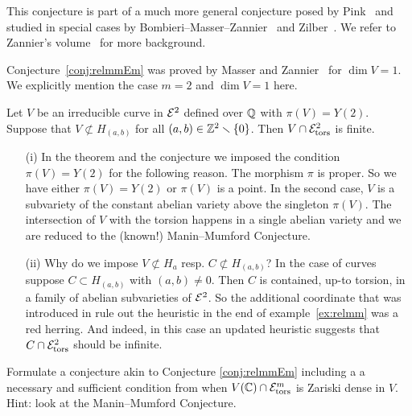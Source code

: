 This conjecture is part of a much more general conjecture posed by
Pink~\cite{Pink} and studied in special cases by
Bombieri--Masser--Zannier~\cite{BMZ,BMZgeometric} and
Zilber~\cite{Zilber}. We refer to Zannier's volume~\cite{ZannierBook}
for more background. 

Conjecture~\ref{conj:relmmEm} was proved by Masser and
Zannier~\cite{MZ:AJM10} for $\dim V = 1$. We explicitly mention the
case $m=2$ and $\dim V=1$ here.

\begin{theorem}
  \label{thm:relmm2}
  Let $V$ be an irreducible curve in ${\mathcal E}^2$ defined over ${\mathbb{Q}}$ with $\pi(V)=Y(2)$. 
  Suppose that $V\not\subset H_{(a,b)}$ for all
  $(a,b)\in{\mathbb{Z}}^2\smallsetminus\{0\}$. Then $V\cap {\mathcal E}^2_{\mathrm{tors}}$ is
  finite. 
\end{theorem}

\begin{remark}
  \begin{enumerate}
  \item [(i)]In the theorem and the conjecture we imposed the condition
    $\pi(V)=Y(2)$ for the following reason. The morphism $\pi$ is proper.
    So we  have either $\pi(V)=Y(2)$ or $\pi(V)$ is a point. In the second
    case, $V$ is a subvariety of the constant abelian variety above the
    singleton $\pi(V)$. The intersection of $V$ with the torsion happens
    in a single abelian variety and we  are reduced to the (known!)
    Manin--Mumford  Conjecture. 
  \item[(ii)] Why do we impose $V\not\subset H_a$ resp. $C\not\subset
    H_{(a,b)}$? In the case of curves suppose  $C\subset H_{(a,b)}$ with
    $(a,b)\not=0$.
    Then $C$ is contained, up-to torsion, in
    a family of abelian subvarieties of ${\mathcal E}^2$. So the additional
    coordinate that was introduced in rule out the heuristic in the
    end of example~\ref{ex:relmm} was a red herring. And indeed, in this case
    an updated heuristic  suggests that  $C\cap
    {\mathcal E}^2_{\mathrm{tors}}$ should be infinite. 
  \end{enumerate} 
\end{remark}


\begin{exercise} 
  Formulate a conjecture akin to Conjecture \ref{conj:relmmEm} including a
  a necessary and  sufficient condition from when $V({\mathbb{C}})\cap
  \mathcal{E}^m_{\mathrm{tors}}$ is Zariski dense in $V$. Hint: look at
  the Manin--Mumford Conjecture. 
\end{exercise}

